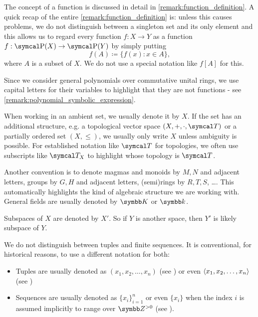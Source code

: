 \begin{enumerate}
   The concept of a function is discussed in detail in \cref{remark:function_definition}. A quick recap of the entire \cref{remark:function_definition} is: unless this causes problems, we do not distinguish between a singleton set and its only element and this allows us to regard every function \( f: X \to Y \) as a function \( f: \Power(X) \to \Power(Y) \) by simply putting
  \begin{equation*}
    f(A) \coloneqq \{ f(x) \colon x \in A \},
  \end{equation*}
  where \( A \) is a subset of \( X \). We do not use a special notation like \( f[A] \) for this.

   Since we consider general polynomials over commutative unital rings, we use capital letters for their variables to highlight that they are not functions - see \cref{remark:polynomial_symbolic_expression}.

   When working in an ambient set, we usually denote it by \( X \). If the set has an additional structure, e.g. a topological vector space \( (X, +, \cdot, \Cal{T}) \) or a partially ordered set \( (X, \leq) \), we usually only write \( X \) unless ambiguity is possible. For established notation like \( \Cal{T} \) for topologies, we often use subscripts like \( \Cal{T}_X \) to highlight whose topology is \( \Cal{T} \).

  Another convention is to denote magmas and monoids by \( M, N \) and adjacent letters, groups by \( G, H \) and adjacent letters, (semi)rings by \( R, T, S \), \ldots. This automatically highlights the kind of algebraic structure we are working with. General fields are usually denoted by \( \K \) or \( \k \).

   Subspaces of \( X \) are denoted by \( X' \). So if \( Y \) is another space, then \( Y' \) is likely subspace of \( Y \).

   We do not distinguish between tuples and finite sequences. It is conventional, for historical reasons, to use a different notation for both:

  \begin{itemize}
    \item Tuples are usually denoted as \( (x_1, x_2, \ldots, x_n) \) (see \cite[1]{Engelking1989}) or even \( \left\langle x_1, x_2, \ldots, x_n \right\rangle \) (see \cite[42]{Enderton1977})
    \item Sequences are usually denoted as \( \{ x_i \}_{i=1}^n \) or even \( \{ x_i \} \) when the index \( i \) is assumed implicitly to range over \( \Z^{>0} \) (see \cite[3.1]{Rudin1991}).
  \end{itemize}


\end{enumerate}
